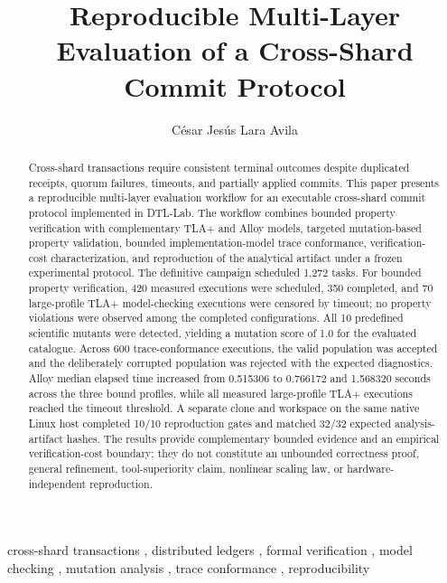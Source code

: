 \documentclass[preprint,12pt]{elsarticle}
\begin{document}
\begin{frontmatter}

\title{Reproducible Multi-Layer Evaluation of a Cross-Shard Commit Protocol}

\author[uni]{César Jesús Lara Avila}
\address[uni]{Universidad Nacional de Ingeniería, Facultad de Ciencias, Ciencia de la Computación, Lima, Peru}

\begin{abstract}
Cross-shard transactions require consistent terminal outcomes despite duplicated receipts, quorum failures, timeouts, and partially applied commits. This paper presents a reproducible multi-layer evaluation workflow for an executable cross-shard commit protocol implemented in DTL-Lab. The workflow combines bounded property verification with complementary TLA+ and Alloy models, targeted mutation-based property validation, bounded implementation-model trace conformance, verification-cost characterization, and reproduction of the analytical artifact under a frozen experimental protocol. The definitive campaign scheduled 1,272 tasks. For bounded property verification, 420 measured executions were scheduled, 350 completed, and 70 large-profile TLA+ model-checking executions were censored by timeout; no property violations were observed among the completed configurations. All 10 predefined scientific mutants were detected, yielding a mutation score of 1.0 for the evaluated catalogue. Across 600 trace-conformance executions, the valid population was accepted and the deliberately corrupted population was rejected with the expected diagnostics. Alloy median elapsed time increased from 0.515306 to 0.766172 and 1.568320 seconds across the three bound profiles, while all measured large-profile TLA+ executions reached the timeout threshold. A separate clone and workspace on the same native Linux host completed 10/10 reproduction gates and matched 32/32 expected analysis-artifact hashes. The results provide complementary bounded evidence and an empirical verification-cost boundary; they do not constitute an unbounded correctness proof, general refinement, tool-superiority claim, nonlinear scaling law, or hardware-independent reproduction.
\end{abstract}

\begin{keyword}
cross-shard transactions \sep
distributed ledgers \sep
formal verification \sep
model checking \sep
mutation analysis \sep
trace conformance \sep
reproducibility
\end{keyword}

\end{frontmatter}
\end{document}
